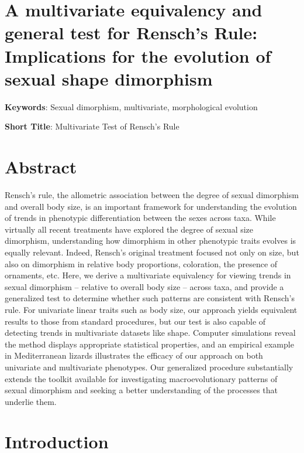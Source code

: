 \documentclass[]{article}
\date{}
\begin{document}
\section{A multivariate equivalency and general test for Rensch's Rule:
Implications for the evolution of sexual shape
dimorphism}\label{a-multivariate-equivalency-and-general-test-for-renschs-rule-implications-for-the-evolution-of-sexual-shape-dimorphism}

\hfill\break

\textbf{Keywords}: Sexual dimorphism, multivariate, morphological
evolution \hfill\break

\textbf{Short Title}: Multivariate Test of Rensch's Rule \hfill\break

\section{Abstract}\label{abstract}

Rensch's rule, the allometric association between the degree of sexual
dimorphism and overall body size, is an important framework for
understanding the evolution of trends in phenotypic differentiation
between the sexes across taxa. While virtually all recent treatments
have explored the degree of sexual size dimorphism, understanding how
dimorphism in other phenotypic traits evolves is equally relevant.
Indeed, Rensch's original treatment focused not only on size, but also
on dimorphism in relative body proportions, coloration, the presence of
ornaments, etc. Here, we derive a multivariate equivalency for viewing
trends in sexual dimorphism -- relative to overall body size -- across
taxa, and provide a generalized test to determine whether such patterns
are consistent with Rensch's rule. For univariate linear traits such as
body size, our approach yields equivalent results to those from standard
procedures, but our test is also capable of detecting trends in
multivariate datasets like shape. Computer simulations reveal the method
displays appropriate statistical properties, and an empirical example in
Mediterranean lizards illustrates the efficacy of our approach on both
univariate and multivariate phenotypes. Our generalized procedure
substantially extends the toolkit available for investigating
macroevolutionary patterns of sexual dimorphism and seeking a better
understanding of the processes that underlie them.

\newpage

\section{Introduction}\label{introduction}
\end{document}
